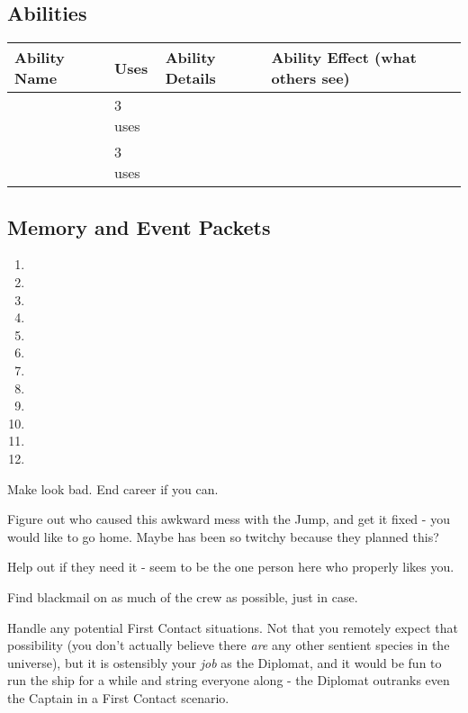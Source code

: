 \documentclass[char]{TMFHope}
\begin{document}
\subsection*{Abilities}
\begin{tabular}{|p{3cm}|p{1.5cm}|p{7cm}|p{4.5cm}|} 
 \hline
 \textbf{Ability Name} & \textbf{Uses} & \textbf{Ability Details} & \textbf{Ability Effect (what others see)} \\ 
\hline 
 \aNegotiation{\MYname} & 3 uses & \aNegotiation{\MYtext} & \aNegotiation{\MYeffect} \\ 
\hline
 \aFirstAid{\MYname} & 3 uses & \aFirstAid{\MYtext} & \aFirstAid{\MYeffect}\\ 
 \hline
\end{tabular}

\subsection*{Memory and Event Packets}
\begin{enumerate}
	\item \mPractice{\MYname}
	\item \mDAlpha{\MYname}
	\item \mDiplomatOne{\MYname}
	\item \mDiplomatTwo{\MYname}
	\item \mDiplomatThree{\MYname}
	\item \mBroom{\MYname}
	\item \mLab{\Myname}
	\item \mPatient{\MYname}
	\item \mKitchen{\MYname}
	\item \mWeight{\MYname}
	\item \mTheater{\MYname}
	\item \mCrates{\MYname}
\end{enumerate}

\begin{itemz}[Goals]
	\item Make \cWeap{} look bad. End \cWeap{\their} career if you can.
	\item Figure out who caused this awkward mess with the Jump, and get it fixed - you would like to go home. Maybe \cXO{} has been so twitchy because they planned this?
	\item Help \cMed{} out if they need it - \cMed{\they} seem\cMed{\plural} to be the one person here who properly likes you.
	\item Find blackmail on as much of the crew as possible, just in case.
	\item Handle any potential First Contact situations. Not that you remotely expect that possibility (you don't actually believe there \emph{are} any other sentient species in the universe), but it is ostensibly your \emph{job} as the Diplomat, and it would be fun to run the ship for a while and string everyone along - the Diplomat outranks even the Captain in a First Contact scenario.
\end{itemz}
\end{document}
